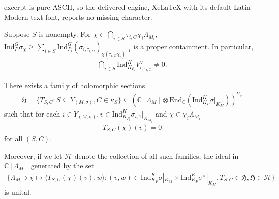 \documentclass[10pt,a4paper]{amsart}
\newcommand{\CC}{\mathbb{C}}
\newcommand{\Ind}{\mathrm{Ind}}
\begin{document}
excerpt is pure ASCII, so the delivered engine, XeLaTeX with its default Latin Modern text font, reports no missing character.
\begin{lemma}\label{lem:cuspnonzero}
 Suppose $S$ is nonempty. For $\chi\in \bigcap_{i\in S}\tau_{i,C}\chi_i\Lambda_{M_i},$ $\Ind_P^G \sigma_\chi\ge \sum_{i\in S} \Ind_{P_i}^G (\sigma_{i,\tau_{i,C}})_{\chi(\tau_{i,C}\chi_i)^{-1}}$ is a proper containment. In particular,
\begin{align*}
    \bigcap_{i\in S} \Ind_{K_{P_i}}^K V_{i,\tau_{i,C}}^\vee \neq 0.
\end{align*}
\end{lemma}

\begin{lemma}\label{lem:varying}
    There exists a family of holomorphic sections 
    \begin{align*}
        \mathfrak{H}=\{T_{S,C}:S\subseteq Y_{(M,\sigma)}, C\in \kappa_S\}\subseteq \left(\CC[\Lambda_M]\otimes \mathrm{End}_\CC (\Ind_{K_P}^K \sigma|_{K_M})\right)^{U_\sigma}
    \end{align*}
    such that for each $i\in Y_{(M,\sigma)},  v\in \mathrm{Ind}_{K_{P_i}}^K \sigma_{i,1}|_{K_{M_i}}$ and $\chi\in \chi_i\Lambda_{M_i}$
    \begin{align*}
        T_{S,C}(\chi)(v)=0
    \end{align*}
    for all $(S,C).$ 
    
    Moreover, if we let $\mathcal{H}$ denote the collection of all such families, the ideal in $\CC[\Lambda_M]$ generated by the set 
    \begin{align*}
        \{\Lambda_{M}\ni \chi \mapsto \langle T_{S,C}(\chi)(v),w \rangle: (v,w)\in \mathrm{Ind}_{K_{P}}^K \sigma|_{K_M}\times \mathrm{Ind}_{K_{P}}^K \sigma^\lor|_{K_M}, T_{S,C}\in \mathfrak{H}, \mathfrak{H}\in \mathcal{H}\}
    \end{align*}
    is unital. 
\end{lemma}
\end{document}
